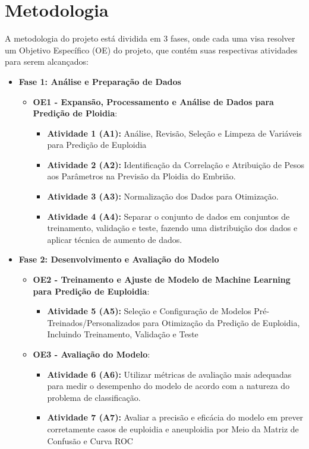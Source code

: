 \section{Metodologia}
A metodologia do projeto está dividida em 3 fases, onde cada uma visa resolver um Objetivo Específico (OE) do projeto, que contém suas respectivas atividades para serem alcançados:

\begin{itemize}
    \item \textbf{Fase 1: Análise e Preparação de Dados}
    \begin{itemize}
        \item \textbf{OE1 - Expansão, Processamento e Análise de Dados para Predição de Ploidia}: 
        \begin{itemize}
            \item \textbf{Atividade 1 (A1):} Análise, Revisão, Seleção e Limpeza de Variáveis para Predição de Euploidia 
            \item \textbf{Atividade 2 (A2):} Identificação da Correlação e Atribuição de Pesos aos Parâmetros na Previsão da Ploidia do Embrião.
            \item \textbf{Atividade 3 (A3):} Normalização dos Dados para Otimização.
            \item \textbf{Atividade 4 (A4):} Separar o conjunto de dados em conjuntos de treinamento, validação e teste, fazendo uma distribuição dos dados e aplicar técnica de aumento de dados.
        \end{itemize}
    \end{itemize}

    \item \textbf{Fase 2: Desenvolvimento e Avaliação do Modelo}
    \begin{itemize}
        \item \textbf{OE2 - Treinamento e Ajuste de Modelo de Machine Learning para Predição de Euploidia}: 
        \begin{itemize}
            \item \textbf{Atividade 5 (A5):} Seleção e Configuração de Modelos Pré-Treinados/Personalizados para Otimização da Predição de Euploidia, Incluindo Treinamento, Validação e Teste
        \end{itemize}

        \item \textbf{OE3 - Avaliação do Modelo}: 
        \begin{itemize}
            \item \textbf{Atividade 6 (A6):} Utilizar métricas de avaliação mais adequadas para medir o desempenho do modelo de acordo com a natureza do problema de classificação.
            \item \textbf{Atividade 7 (A7):} Avaliar a precisão e eficácia do modelo em prever corretamente casos de euploidia e aneuploidia  por Meio da Matriz de Confusão e Curva ROC
        \end{itemize}


\end{itemize}
\end{itemize}
